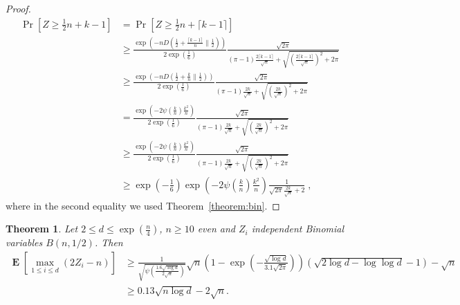 \documentclass{article}
\DeclareMathOperator*{\Exp}{\mathbf{E}}
\newtheorem{theorem}{Theorem}
\begin{document}
\begin{proof}
\begin{align*}
\Pr \left[ Z \ge  \frac{1}{2} n + k-1 \right]
& = \Pr \left[ Z \ge \frac{1}{2} n + \lceil k - 1\rceil \right] \\
& \ge \frac{\exp\left(-n D(\frac{1}{2}+\frac{\lceil k -1\rceil}{n} \| \frac{1}{2})\right)}{2 \exp\left(\frac{1}{6}\right)} \frac{\sqrt{2 \pi}}{(\pi-1)\frac{2\lceil k -1\rceil}{\sqrt{n}}+\sqrt{\left(\frac{2\lceil k -1\rceil}{\sqrt{n}}\right)^2+2 \pi}} \\
& \ge \frac{\exp\left(-n D(\frac{1}{2}+\frac{k}{n} \| \frac{1}{2})\right)}{2 \exp\left(\frac{1}{6}\right)} \frac{\sqrt{2 \pi}}{(\pi-1)\frac{2k}{\sqrt{n}}+\sqrt{\left(\frac{2k}{\sqrt{n}}\right)^2+2 \pi}} \\
& = \frac{\exp\left(- 2 \psi(\frac{k}{n}) \frac{k^2}{n} \right)}{2 \exp\left(\frac{1}{6}\right)} \frac{\sqrt{2 \pi}}{(\pi-1)\frac{2k}{\sqrt{n}}+\sqrt{\left(\frac{2k}{\sqrt{n}}\right)^2+2 \pi}} \\
& \ge \frac{\exp\left(- 2 \psi(\frac{k}{n}) \frac{k^2}{n} \right)}{2 \exp\left(\frac{1}{6}\right)} \frac{\sqrt{2 \pi}}{(\pi-1)\frac{2k}{\sqrt{n}}+\sqrt{\left(\frac{2k}{\sqrt{n}}\right)^2+2 \pi}} \\
& \ge \exp\left(-\frac{1}{6}\right) \exp\left(- 2 \psi\left(\frac{k}{n}\right) \frac{k^2}{n} \right) \frac{1}{\sqrt{2\pi} \frac{2 k}{\sqrt{n}} + 2} \; ,
\end{align*}
where in the second equality we used Theorem~\ref{theorem:bin}.
\end{proof}

\begin{theorem}
\label{theorem:max_bin}
Let $2 \le d \le \exp(\frac{n}{4})$, $n\ge 10$ even and $Z_i$ independent Binomial variables $B(n,1/2)$. Then
\begin{align*}
\Exp \left[ \max_{1 \le i \le d} (2 Z_i - n)\right]
& \ge \frac{1}{\sqrt{\psi\left(\frac{1.6\sqrt{\log d}}{2 \sqrt{n}}\right)}}\sqrt{n}\left(1 - \exp\left(-\frac{\sqrt{\log d}}{3.1 \sqrt{2\pi}}\right)\right) \left(\sqrt{2 \log d -\log \log d}-1\right) -\sqrt{n} \\
& \ge 0.13 \sqrt{n \log d} - 2 \sqrt{n}.
\end{align*}
\end{theorem}
\end{document}

